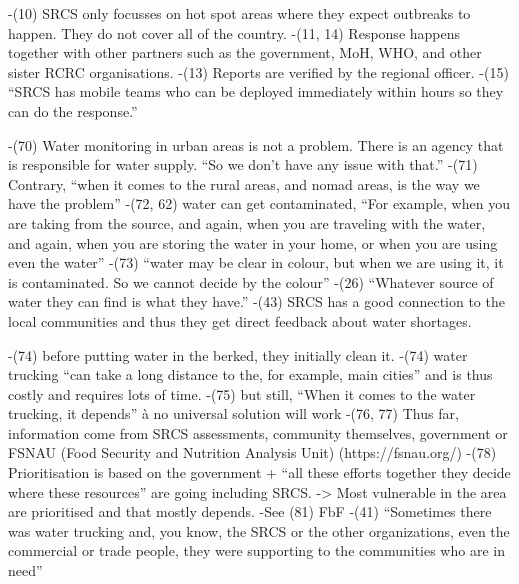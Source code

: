 -(10) SRCS only focusses on hot spot areas where they expect outbreaks to happen. They do not cover all of the country.
-(11, 14) Response happens together with other partners such as the government, MoH, WHO, and other sister RCRC organisations.
-(13) Reports are verified by the regional officer.
-(15) “SRCS has mobile teams who can be deployed immediately within hours so they can do the response.”

-(70) Water monitoring in urban areas is not a problem. There is an agency that is responsible for water supply. “So we don't have any issue with that.”
-(71) Contrary, “when it comes to the rural areas, and nomad areas, is the way we have the problem”
-(72, 62) water can get contaminated, “For example, when you are taking from the source, and again, when you are traveling with the water, and again, when you are storing the water in your home, or when you are using even the water”
-(73) “water may be clear in colour, but when we are using it, it is contaminated. So we cannot decide by the colour”
-(26) “Whatever source of water they can find is what they have.”
-(43) SRCS has a good connection to the local communities and thus they get direct feedback about water shortages.

-(74) before putting water in the berked, they initially clean it.
-(74) water trucking “can take a long distance to the, for example, main cities” and is thus costly and requires lots of time.
-(75) but still, “When it comes to the water trucking, it depends” à no universal solution will work
-(76, 77) Thus far, information come from SRCS assessments, community themselves, government or FSNAU (Food Security and Nutrition Analysis Unit) (https://fsnau.org/)
-(78) Prioritisation is based on the government + “all these efforts together they decide where these resources” are going including SRCS. -> Most vulnerable in the area are prioritised and that mostly depends.
-See (81) FbF
-(41) “Sometimes there was water trucking and, you know, the SRCS or the other organizations, even the commercial or trade people, they were supporting to the communities who are in need”

